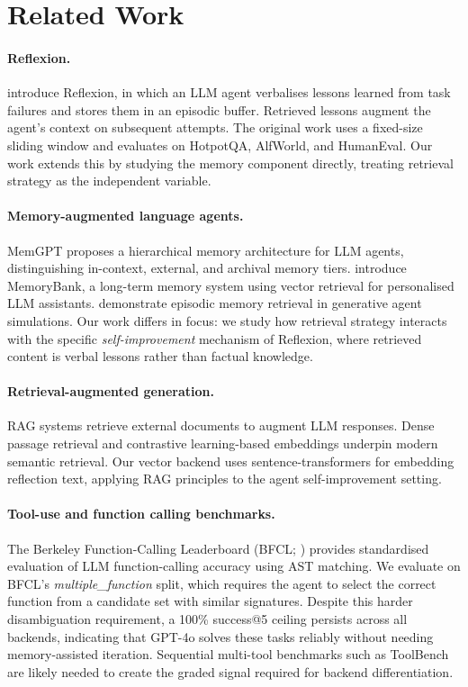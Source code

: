 \documentclass{article}
\begin{document}
\section{Related Work}
\label{sec:related}

\paragraph{Reflexion.}
\citet{shinn2023reflexion} introduce Reflexion, in which an LLM agent
verbalises lessons learned from task failures and stores them in an episodic
buffer. Retrieved lessons augment the agent's context on subsequent attempts.
The original work uses a fixed-size sliding window and evaluates on HotpotQA,
AlfWorld, and HumanEval. Our work extends this by studying the memory
component directly, treating retrieval strategy as the independent variable.

\paragraph{Memory-augmented language agents.}
MemGPT \citep{packer2023memgpt} proposes a hierarchical memory architecture
for LLM agents, distinguishing in-context, external, and archival memory
tiers. \citet{zhong2024memorybank} introduce MemoryBank, a long-term memory
system using vector retrieval for personalised LLM assistants.
\citet{park2023generative} demonstrate episodic memory retrieval in generative
agent simulations. Our work differs in focus: we study how retrieval strategy
interacts with the specific \emph{self-improvement} mechanism of Reflexion,
where retrieved content is verbal lessons rather than factual knowledge.

\paragraph{Retrieval-augmented generation.}
RAG systems \citep{lewis2020retrieval} retrieve external documents to augment
LLM responses. Dense passage retrieval \citep{karpukhin2020dense} and
contrastive learning-based embeddings \citep{reimers2019sentencebert} underpin
modern semantic retrieval. Our vector backend uses sentence-transformers
\citep{reimers2019sentencebert} for embedding reflection text, applying RAG
principles to the agent self-improvement setting.

\paragraph{Tool-use and function calling benchmarks.}
The Berkeley Function-Calling Leaderboard (BFCL; \citealt{yan2024bfcl})
provides standardised evaluation of LLM function-calling accuracy using AST
matching. We evaluate on BFCL's \emph{multiple\_function} split, which
requires the agent to select the correct function from a candidate set with
similar signatures. Despite this harder disambiguation requirement, a 100\%
success@5 ceiling persists across all backends, indicating that GPT-4o
solves these tasks reliably without needing memory-assisted iteration.
Sequential multi-tool benchmarks such as ToolBench \citep{qin2023toolllm}
are likely needed to create the graded signal required for backend
differentiation.
\end{document}
